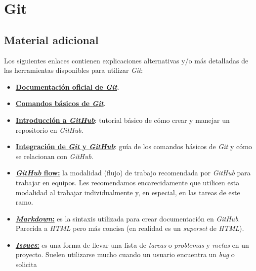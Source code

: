 \chapter{Git}
      \section{Material adicional}
        Los siguientes enlaces contienen explicaciones alternativas y/o más detalladas de
        las herramientas disponibles para utilizar \textit{Git}:
        
        \begin{itemize}
          \item \href{https://git-scm.com}{\textbf{Documentación oficial de 
            \textit{Git}}}.
          \item \href{https://rogerdudler.github.io/git-guide/}{\textbf{Comandos básicos 
            de \textit{Git}}}.
          \item \href{https://guides.github.com/activities/hello-world/}{
            \textbf{Introducción a \textit{GitHub}}}: tutorial básico de cómo crear y 
            manejar un repositorio en \textit{GitHub}. 
          \item \href{https://guides.github.com/introduction/git-handbook/}{
            \textbf{Integración de \textit{Git} y \textit{GitHub}}}: guía de los comandos 
            básicos de \textit{Git} y cómo se relacionan con \textit{GitHub}.
          \item \href{https://guides.github.com/introduction/flow/}{\textbf{
            \textit{GitHub} flow:}} la modalidad (flujo) de trabajo recomendada por 
            \textit{GitHub} para trabajar en equipos.
            Les recomendamos encarecidamente que utilicen esta modalidad al trabajar 
            individualmente y, en especial, en las tareas de este ramo.
          \item \href{https://guides.github.com/features/mastering-markdown/}{
            \textbf{\textit{Markdown}:}} es la sintaxis utilizada para crear documentación
            en \textit{GitHub}.
            Parecida a \textit{HTML} pero más concisa (en realidad es un \textit{superset}
            de \textit{HTML}). 
          \item \href{https://guides.github.com/features/issues/}{
            \textbf{\textit{Issues}:}} es una forma de llevar una lista de \textit{tareas}
            o \textit{problemas} y \textit{metas} en un proyecto.
            Suelen utilizarse mucho cuando un usuario encuentra un \textit{bug} o solicita

\end{itemize}
